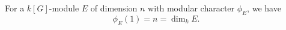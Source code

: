 For a $k[G]$-module $E$ of dimension $n$ with modular character $\phi_E$, we have
$$\phi_E(1) = n = \dim_k E.$$
